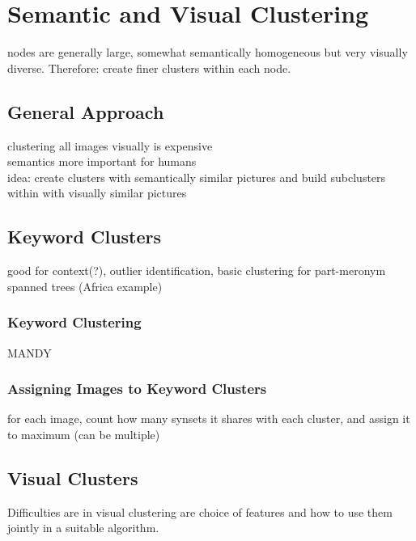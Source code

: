 %
\section{Semantic and Visual Clustering}
\label{sec_inhalt}

nodes are generally large, somewhat semantically homogeneous but very visually diverse. Therefore: create finer clusters within each node.

\subsection{General Approach}
clustering all images visually is expensive \\
semantics more important for humans \\
idea: create clusters with semantically similar pictures and build subclusters within with visually similar pictures

\subsection{Keyword Clusters}
good for context(?), outlier identification, basic clustering for part-meronym spanned trees (Africa example)

\subsubsection{Keyword Clustering}
MANDY

\subsubsection{Assigning Images to Keyword Clusters}
for each image, count how many synsets it shares with each cluster, and assign it to maximum (can be multiple)


\subsection{Visual Clusters}

Difficulties are in visual clustering are choice of features and how to use them jointly in a suitable algorithm. 


